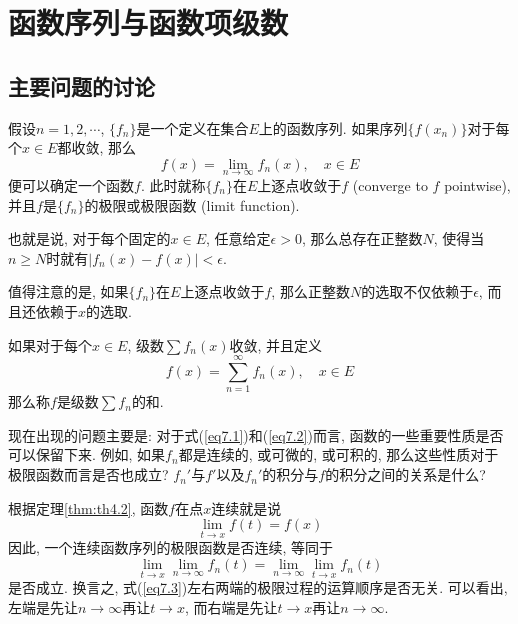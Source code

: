 \documentclass[cn,12pt,math=mtpro2,citestyle=gb7714-2015,bibstyle=gb7714-2015,twocol]{elegantbook}
\newcommand{\limn}{\lim_{n\to\infty}}
\begin{document}
\chapter{函数序列与函数项级数}
\section{主要问题的讨论}
\begin{definition}
假设$n=1,2,\cdots$, $\{f_n\}$是一个定义在集合$E$上的函数序列. 如果序列$\{f(x_n)\}$对于每个$x\in E$都收敛, 那么
\begin{equation}\label{eq7.1}
  f(x)=\limn f_n(x),\quad x\in E
\end{equation}
便可以确定一个函数$f$. 此时就称$\{f_n\}$在$E$上逐点收敛于$f$ (converge to $f$ pointwise), 并且$f$是$\{f_n\}$的极限或极限函数 (limit function).
\end{definition}

也就是说, 对于每个固定的$x\in E$, 任意给定$\epsilon>0$, 那么总存在正整数$N$, 使得当$n\geq N$时就有$|f_n(x)-f(x)|<\epsilon$.

值得注意的是, 如果$\{f_n\}$在$E$上逐点收敛于$f$, 那么正整数$N$的选取不仅依赖于$\epsilon$, 而且还依赖于$x$的选取.

\begin{definition}
如果对于每个$x\in E$, 级数$\sum f_n(x)$收敛, 并且定义
\begin{equation}\label{eq7.2}
  f(x)=\sum_{n=1}^{\infty}f_n(x),\quad x\in E
\end{equation}
那么称$f$是级数$\sum f_n$的和.
\end{definition}
现在出现的问题主要是: 对于式(\ref{eq7.1})和(\ref{eq7.2})而言, 函数的一些重要性质是否可以保留下来. 例如, 如果$f_n$都是连续的, 或可微的, 或可积的, 那么这些性质对于极限函数而言是否也成立? $f_n'$与$f'$以及$f_n'$的积分与$f$的积分之间的关系是什么?

根据定理\ref{thm:th4.2}, 函数$f$在点$x$连续就是说
$$\lim_{t\to x}f(t)=f(x)$$
因此, 一个连续函数序列的极限函数是否连续, 等同于
\begin{equation}\label{eq7.3}
  \lim_{t\to x}\limn f_n(t)=\limn \lim_{t\to x}f_n(t)
\end{equation}
是否成立. 换言之, 式(\ref{eq7.3})左右两端的极限过程的运算顺序是否无关. 可以看出, 左端是先让$n\to\infty$再让$t\to x$, 而右端是先让$t\to x$再让$n\to\infty$.
\end{document}
